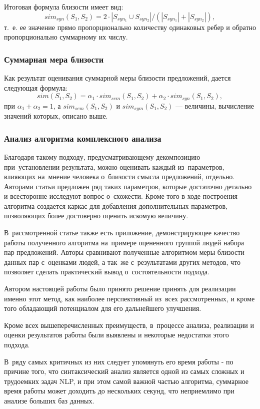 Итоговая формула близости имеет вид: 
$$sim_{syn}(S_1, S_2) = 2 \cdot |S_{syn_1} \cup S_{syn_2}| / (|S_{syn_1}| + |S_{syn_2}|),$$ 
т.~е. ее значение прямо пропорционально количеству одинаковых ребер
и обратно пропорционально суммарному их числу.

\subsubsection{Суммарная мера близости}

Как результат оценивания суммарной меры близости предложений, 
дается следующая формула:
$$sim(S_1, S_2) = \alpha_1 \cdot sim_{sem}(S_1, S_2) + \alpha_2 \cdot sim_{syn}(S_1, S_2),$$
 при $\alpha_1+\alpha_2=1$,
а $sim_{sem}(S_1, S_2)$ и 
$sim_{sym}(S_1, S_2)$ --- величины, вычисление значений которых, описано выше.

\subsubsection{Анализ алгоритма комплексного анализа}
\label{sec:complex_algorithm_analysis}
Благодаря такому подходу, предусматривающему декомпозицию при~установлении результата, 
можно оценивать каждый из~параметров, влияющих на~мнение человека о~близости смысла предложений, отдельно. 
Авторами статьи предложен ряд таких параметров, 
которые достаточно детально и всесторонне исследуют вопрос о~схожести. Кроме того
в ходе построения алгоритма создается каркас для добавления дополнительных параметров,
позволяющих более достоверно оценить искомую величину. 

В~рассмотренной статье\cite{complexSim} также есть приложение, демонстрирующее качество работы
полученного алгоритма на~примере оцененного группой людей набора пар предложений.
Авторы сравнивают полученные алгоритмом меры близости данных пар с~оценками людей, 
а так~же с~результатами других методов, что позволяет сделать практический вывод
о~состоятельности подхода.

Автором настоящей работы было принято решение принять для реализации именно этот метод,
как наиболее перспективный из~всех рассмотренных, и кроме того обладающий
потенциалом для его дальнейшего улучшения.

Кроме всех вышеперечисленных преимуществ, в~процессе анализа, 
реализации и оценки результатов работы были выявлены
и некоторые недостатки этого подхода.

В~ряду самых критичных из них следует упомянуть его время работы - 
по причине того, что синтаксический анализ является одной из самых
сложных и трудоемких задач NLP, и при этом самой важной частью алгоритма,
суммарное время работы может доходить до нескольких секунд,
что неприемлимо при анализе больших баз данных.

